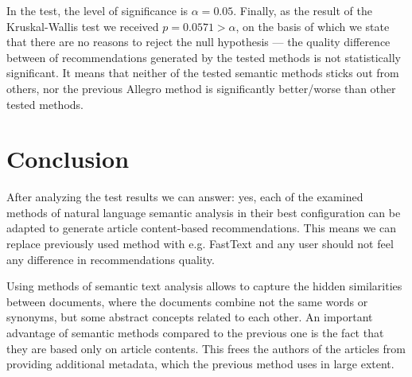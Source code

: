 \documentclass[twoside,twocolumn]{article}
\begin{document}
	In the test, the level of significance is $\alpha = 0.05$. Finally, as the result of the Kruskal-Wallis test we received $p = 0.0571>\alpha$, on the basis of which we state that there are no reasons to reject the null hypothesis --- the quality difference between of recommendations generated by the tested methods is not statistically significant. It means that neither of the tested semantic methods sticks out from others, nor the previous Allegro method is significantly better/worse than other tested methods.
	
	\section{Conclusion}
	
	After analyzing the test results we can answer: yes, each of the examined methods of natural language semantic analysis in their best configuration can be adapted to generate article content-based recommendations. This means we can replace previously used method with e.g. FastText and any user should not feel any difference in recommendations quality.
	
	Using methods of semantic text analysis allows to capture the hidden similarities between documents, where the documents combine not the same words or synonyms, but some abstract concepts related to each other. An important advantage of semantic methods compared to the previous one is the fact that they are based only on article contents. This frees the authors of the articles from providing additional metadata, which the previous method uses in large extent.
	
\end{document}
